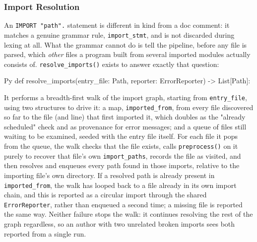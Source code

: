 \subsubsection{Import Resolution}
An \lstinline|IMPORT "path".| statement is different in kind from a doc comment: it matches a genuine grammar rule, \lstinline|import_stmt|, and is not discarded during lexing at all. What the grammar cannot do is tell the pipeline, before any file is parsed, which \emph{other} files a program built from several imported modules actually consists of. \lstinline|resolve_imports()| exists to answer exactly that question:
\begin{codeblock}[]{Py}
def resolve_imports(entry_file: Path, reporter: ErrorReporter) -> List[Path]:
\end{codeblock}
It performs a breadth-first walk of the import graph, starting from \lstinline|entry_file|, using two structures to drive it: a map, \lstinline|imported_from|, from every file discovered so far to the file (and line) that first imported it, which doubles as the "already scheduled" check and as provenance for error messages; and a queue of files still waiting to be examined, seeded with the entry file itself. For each file it pops from the queue, the walk checks that the file exists, calls \lstinline|preprocess()| on it purely to recover that file's own \lstinline|import_paths|, records the file as visited, and then resolves and enqueues every path found in those imports, relative to the importing file's own directory. If a resolved path is already present in \lstinline|imported_from|, the walk has looped back to a file already in its own import chain, and this is reported as a circular import through the shared \lstinline|ErrorReporter|, rather than enqueued a second time; a missing file is reported the same way. Neither failure stops the walk: it continues resolving the rest of the graph regardless, so an author with two unrelated broken imports sees both reported from a single run.


